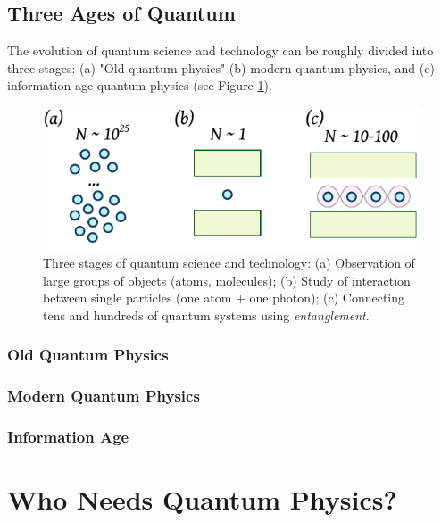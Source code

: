 \subsection{Three Ages of Quantum}
The evolution of quantum science and technology can be roughly divided into three stages: (a) "Old quantum physics" (b) modern quantum physics, and (c) information-age quantum physics (see Figure \ref{fig:quantumTechnologyEvolution}).
\begin{figure}[htbp]
	\centering
	\includegraphics[scale=1.0]{quantumTechnologyEvolution}
	\caption{Three stages of quantum science and technology: (a) Observation of large groups of objects (atoms, molecules); (b) Study of interaction between single particles (one atom + one photon); (c) Connecting tens and hundreds of quantum systems using \emph{entanglement}.}
	\label{fig:quantumTechnologyEvolution}
\end{figure}



\subsubsection*{Old Quantum Physics}

\subsubsection*{Modern Quantum Physics}

\subsubsection*{Information Age}


\section{Who Needs Quantum Physics?}

